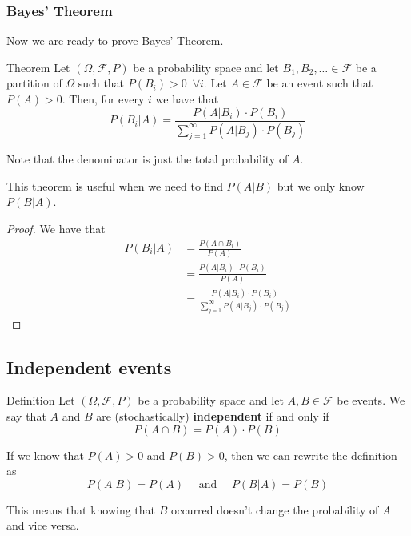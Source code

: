 \documentclass[10pt]{extarticle}
\newcommand{\F}{\mathcal{F}}
\begin{document}
\subsubsection{Bayes' Theorem}

Now we are ready to prove Bayes' Theorem.

\begin{bluebox}{Theorem}
    Let $(\Omega, \F, P)$ be a probability space and let $B_1, B_2, \dots \in \F$ be a partition of $\Omega$
    such that $P(B_i) > 0 \enspace \forall i$.
    Let $A \in \F$ be an event such that $P(A) > 0$.
    Then, for every $i$ we have that
    $$
        P(B_i|A) = \frac{P(A|B_i) \cdot P(B_i)}{\sum_{j=1}^\infty P(A|B_j) \cdot P(B_j)}
    $$
\end{bluebox}

Note that the denominator is just the total probability of $A$.

This theorem is useful when we need to find $P(A|B)$ but we only know $P(B|A)$.

\begin{proof}
    We have that
    \begin{align*}
        P(B_i|A) & = \frac{P(A \cap B_i)}{P(A)}                                            \\
                 & = \frac{P(A|B_i) \cdot P(B_i)}{P(A)}                                    \\
                 & = \frac{P(A|B_i) \cdot P(B_i)}{\sum_{j=1}^\infty P(A|B_j) \cdot P(B_j)}
    \end{align*}
\end{proof}

\subsection{Independent events}

\begin{bluebox}{Definition}
    Let $(\Omega, \F, P)$ be a probability space and let $A, B \in \F$ be events.
    We say that $A$ and $B$ are (stochastically) \textbf{independent} if and only if
    $$
        P(A \cap B) = P(A) \cdot P(B)
    $$
\end{bluebox}

If we know that $P(A) > 0$ and $P(B) > 0$, then we can rewrite the definition as
$$
    P(A|B) = P(A) \quad \text{ and } \quad P(B|A) = P(B)
$$

This means that knowing that $B$ occurred doesn't change the probability of $A$ and vice versa.
\end{document}
